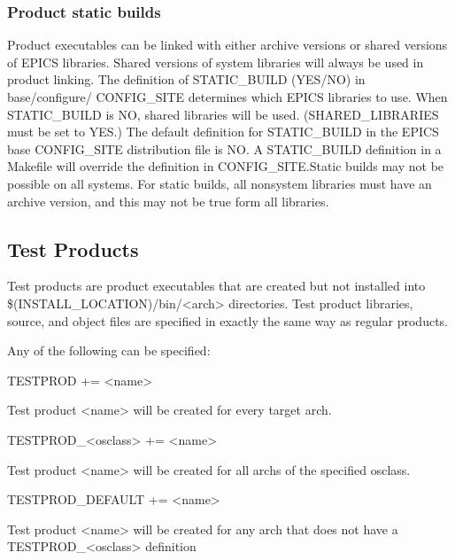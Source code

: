 \subsubsection{Product static builds}

Product executables can be linked with either archive versions or shared versions of EPICS libraries. Shared versions of 
system libraries will always be used in product linking. The definition of STATIC\_BUILD (YES/NO) in base/configure/
CONFIG\_SITE determines which EPICS libraries to use. When STATIC\_BUILD is NO, shared libraries will be used.  
(SHARED\_LIBRARIES must be set to YES.) The default definition for STATIC\_BUILD in the EPICS base 
CONFIG\_SITE distribution file is NO. A STATIC\_BUILD definition in a Makefile will override the definition in 
CONFIG\_SITE.Static builds may not be possible on all systems. For static builds, all nonsystem libraries must have an 
archive version, and this may not be true form all libraries.

\subsection{Test Products}

Test products are product executables that are created but not installed into \$(INSTALL\_LOCATION)/bin/\textless{}arch\textgreater{} 
directories. Test product libraries, source, and object files are specified in exactly the same way as regular products. 

Any of the following can be specified:

\begin{description}\item {}TESTPROD += \textless{}name\textgreater{}

\end{description}Test product \textless{}name\textgreater{} will be created for every target arch.

\begin{description}\item TESTPROD\_\textless{}osclass\textgreater{} += \textless{}name\textgreater{}

\end{description}Test product \textless{}name\textgreater{} will be created for all archs of the specified osclass.

\begin{description}\item TESTPROD\_DEFAULT += \textless{}name\textgreater{}

\end{description}Test product \textless{}name\textgreater{} will be created for any arch that does not have a TESTPROD\_\textless{}osclass\textgreater{} definition


